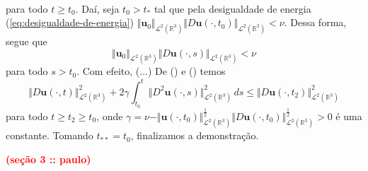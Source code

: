 \documentclass[a4paper, 11pt]{book}
\theoremstyle{definition}
\newcommand{\bR}{\mathbb{R}}
\newcommand{\bu}{\mathbf{u}}
\newcommand{\cL}{\mathcal{L}}
\begin{document}
\begin{prf}
\[\begin{aligned}
        \end{aligned}
    \]
    para todo $t \geqslant t_0$. Daí, seja $t_0 > t_*$ tal que pela desigualdade de energia (\ref{eq:desigualdade-de-energia}) $\Vert \bu_0 \Vert_{\cL^2(\bR^3)} \Vert D\bu(\cdot,t_0 ) \Vert_{\cL^2(\bR^3)} < \nu$.
    Dessa forma, segue que
    \[
        \Vert \bu_0 \Vert_{\cL^2(\bR^3)} \Vert D\bu(\cdot,s) \Vert_{\cL^2(\bR^3)} < \nu
    \]
    para todo $s > t_0$.
    Com efeito, (...)
    De () e () temos
    \[
        \Vert D\bu(\cdot,t) \Vert_{\cL^2(\bR^3)}^2 + 2 \gamma \! \int_{t_0}^{t} \Vert D^2 \bu(\cdot,s) \Vert_{\cL^2(\bR^3)}^2 \,ds \leqslant \Vert D\bu(\cdot,t_2) \Vert_{\cL^2(\bR^3)}^2
    \]
    para todo $t \geqslant t_2 \geqslant t_0$, onde $\gamma = \nu - \Vert \bu(\cdot,t_0) \Vert_{\cL^2(\bR^3)}^{\frac{1}{2}} \Vert D\bu(\cdot,t_0) \Vert_{\cL^2(\bR^3)}^{\frac{1}{2}} > 0$ é uma constante.
    Tomando $t_{**} = t_0$, finalizamos a demonstração.
\end{prf}

\noindent\textbf{\textcolor{red}{(seção 3 :: paulo)}}
\end{document}
